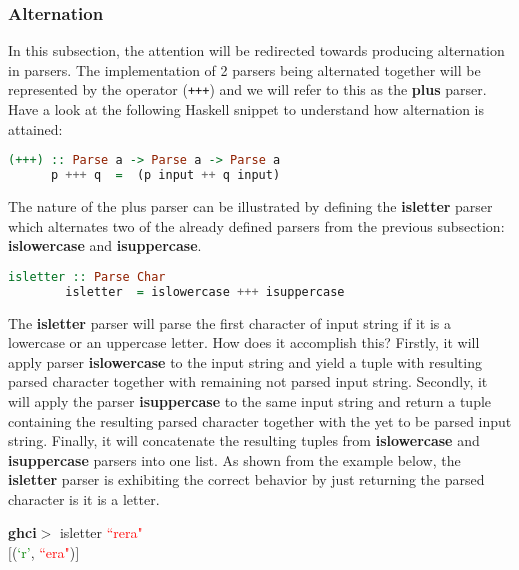 \documentclass[a4paper, onecolumn]{article}
\begin{document}
    \subsubsection{Alternation}
    
    In this subsection, the attention will be redirected towards producing alternation in parsers.  The implementation of 2 parsers being alternated together will be represented by the operator (\texttt{+++}) and we will refer to this as the \textbf{plus} parser. Have a look at the following Haskell snippet to understand how alternation is attained:
    
    \begin{tcolorbox}
    \begin{lstlisting}[language=Haskell]
      (+++) :: Parse a -> Parse a -> Parse a
      p +++ q  =  (p input ++ q input)
    \end{lstlisting}
    \end{tcolorbox}
    \noindent The nature of the plus parser can be illustrated by defining the \textbf{isletter} parser which alternates two of the already defined parsers from the previous subsection: \textbf{islowercase} and \textbf{isuppercase}.
    
    \begin{tcolorbox}
    \begin{lstlisting}[language=Haskell] 
        isletter :: Parse Char
        isletter  = islowercase +++ isuppercase
    \end{lstlisting}
    \end{tcolorbox}
    
    \noindent The \textbf{isletter} parser will parse the first character of input string if it is a lowercase or an uppercase letter. How does it accomplish this? Firstly, it will apply parser \textbf{islowercase} to the input string and yield a tuple with resulting parsed character together with remaining not parsed input string. Secondly, it will apply the parser \textbf{isuppercase} to the same input string and return a tuple containing the resulting  parsed character together with the yet to be parsed input string. Finally, it will concatenate the resulting tuples from \textbf{islowercase} and \textbf{isuppercase} parsers into one list. As shown from the example below, the \textbf{isletter} parser is exhibiting the correct behavior by just returning the parsed character is it is a letter.
    
    \begin{center}
            \textbf{ghci$>$} isletter \textcolor{red}{``rera"} \\
            $\big[$(\textcolor{green}{`r'}, \textcolor{red}{``era"})$\big]$
    \end{center}
    
\end{document}

